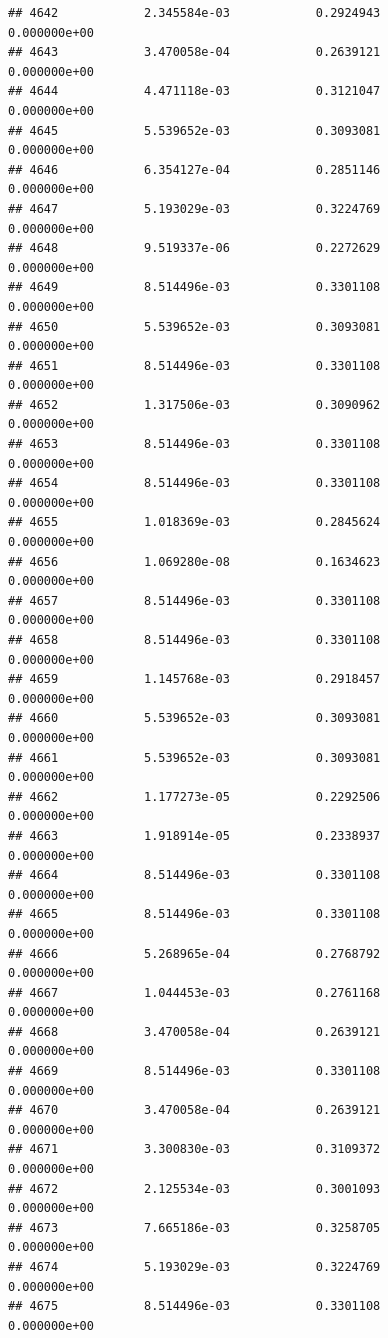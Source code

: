 \documentclass[
]{article}
\begin{document}
\begin{verbatim}
## 4642            2.345584e-03            0.2924943            0.000000e+00
## 4643            3.470058e-04            0.2639121            0.000000e+00
## 4644            4.471118e-03            0.3121047            0.000000e+00
## 4645            5.539652e-03            0.3093081            0.000000e+00
## 4646            6.354127e-04            0.2851146            0.000000e+00
## 4647            5.193029e-03            0.3224769            0.000000e+00
## 4648            9.519337e-06            0.2272629            0.000000e+00
## 4649            8.514496e-03            0.3301108            0.000000e+00
## 4650            5.539652e-03            0.3093081            0.000000e+00
## 4651            8.514496e-03            0.3301108            0.000000e+00
## 4652            1.317506e-03            0.3090962            0.000000e+00
## 4653            8.514496e-03            0.3301108            0.000000e+00
## 4654            8.514496e-03            0.3301108            0.000000e+00
## 4655            1.018369e-03            0.2845624            0.000000e+00
## 4656            1.069280e-08            0.1634623            0.000000e+00
## 4657            8.514496e-03            0.3301108            0.000000e+00
## 4658            8.514496e-03            0.3301108            0.000000e+00
## 4659            1.145768e-03            0.2918457            0.000000e+00
## 4660            5.539652e-03            0.3093081            0.000000e+00
## 4661            5.539652e-03            0.3093081            0.000000e+00
## 4662            1.177273e-05            0.2292506            0.000000e+00
## 4663            1.918914e-05            0.2338937            0.000000e+00
## 4664            8.514496e-03            0.3301108            0.000000e+00
## 4665            8.514496e-03            0.3301108            0.000000e+00
## 4666            5.268965e-04            0.2768792            0.000000e+00
## 4667            1.044453e-03            0.2761168            0.000000e+00
## 4668            3.470058e-04            0.2639121            0.000000e+00
## 4669            8.514496e-03            0.3301108            0.000000e+00
## 4670            3.470058e-04            0.2639121            0.000000e+00
## 4671            3.300830e-03            0.3109372            0.000000e+00
## 4672            2.125534e-03            0.3001093            0.000000e+00
## 4673            7.665186e-03            0.3258705            0.000000e+00
## 4674            5.193029e-03            0.3224769            0.000000e+00
## 4675            8.514496e-03            0.3301108            0.000000e+00

\end{verbatim}
\end{document}
